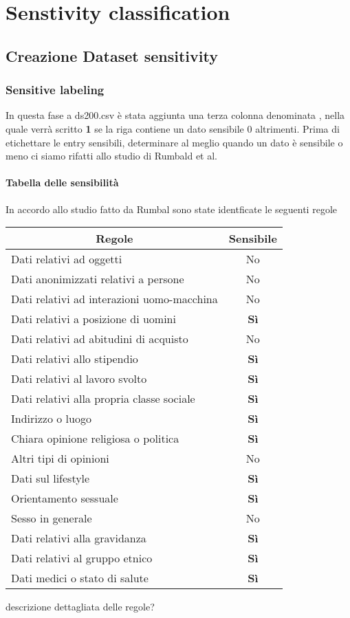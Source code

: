 \section{Senstivity classification}

\subsection{Creazione Dataset sensitivity}

\subsubsection{Sensitive labeling}
In questa fase a ds200.csv è stata aggiunta una terza colonna denominata , nella quale verrà scritto \textbf{1} se la riga contiene un dato sensibile 0 altrimenti.\newline
Prima di etichettare le entry sensibili, determinare al meglio quando un dato è sensibile o meno ci siamo rifatti allo studio di Rumbald et al.\cite{dataSpectrum}

\paragraph{Tabella delle sensibilità}
In accordo allo studio fatto da Rumbal sono state identficate le seguenti regole
\FloatBarrier
\begin{table}[h]
\begin{tabular}{|l|c|}
\hline
\multicolumn{1}{|c|}{\textbf{Regole}} & \textbf{Sensibile} \\ \hline
Dati relativi ad oggetti & No \\ \hline
Dati anonimizzati relativi a persone & No \\ \hline
Dati relativi ad interazioni uomo-macchina & No \\ \hline
Dati relativi a posizione di uomini & \textbf{Sì} \\ \hline
Dati relativi ad abitudini di acquisto & No \\ \hline
Dati relativi allo stipendio & \textbf{Sì} \\ \hline
Dati relativi al lavoro svolto & \textbf{Sì} \\ \hline
Dati relativi alla propria classe sociale & \textbf{Sì} \\ \hline
Indirizzo o luogo & \textbf{Sì} \\ \hline
Chiara opinione religiosa o politica & \textbf{Sì} \\ \hline
Altri tipi di opinioni & No \\ \hline
Dati sul lifestyle & \textbf{Sì} \\ \hline
Orientamento sessuale & \textbf{Sì} \\ \hline
Sesso in generale & No \\ \hline
Dati relativi alla gravidanza & \textbf{Sì} \\ \hline
Dati relativi al gruppo etnico & \textbf{Sì} \\ \hline
Dati medici o stato di salute & \textbf{Sì} \\ \hline
\end{tabular}
\end{table}
\FloatBarrier
descrizione dettagliata delle regole?\newline
